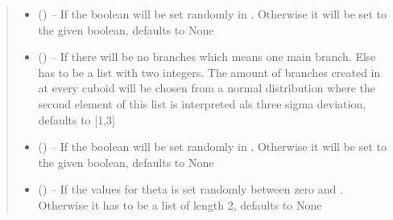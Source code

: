 \documentclass[letterpaper,10pt,english]{sphinxmanual}
\begin{document}
\begin{fulllineitems}
\begin{fulllineitems}
\begin{quote}
\begin{description}
\begin{itemize}
\item {} 
 (\sphinxstyleliteralemphasis{\sphinxupquote{, }}) -- If  the boolean will be set randomly in {\hyperref[\detokenize{index:dataset.dataset_cuboids.create_random_parameters}]{}}. Otherwise it will be set to the given boolean, defaults to None

\item {} 
 (\sphinxstyleliteralemphasis{\sphinxupquote{, }}) -- If  there will be no branches which means one main branch. Else has to be a list with two integers. The amount of branches created in {\hyperref[\detokenize{index:dataset.dataset_cuboids.create_random_parameters}]{}} at every cuboid will be chosen from a normal distribution where the second element of this list is interpreted als three sigma deviation, defaults to {[}1,3{]}

\item {} 
 (\sphinxstyleliteralemphasis{\sphinxupquote{, }}) -- If  the boolean will be set randomly in {\hyperref[\detokenize{index:dataset.dataset_cuboids.create_random_parameters}]{}}. Otherwise it will be set to the given boolean, defaults to None

\item {} 
 (\sphinxstyleliteralemphasis{\sphinxupquote{, }}) -- If  the values for theta is set randomly between zero and . Otherwise it has to be a list of length 2, defaults to None


\end{itemize}
\end{description}
\end{quote}
\end{fulllineitems}
\end{fulllineitems}
\end{document}
